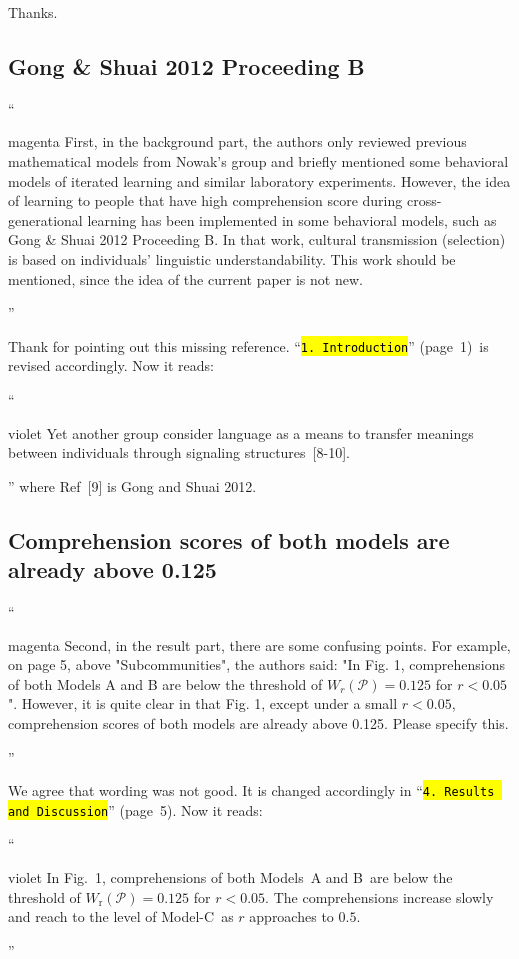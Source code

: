 \documentclass[10.5pt]{amsart}
\newcommand{\reffig}[1]{Fig.~\ref{#1}}
\newcommand{\hbColorReviewer}{magenta}
\newcommand{\hbColorManuscript}{violet}
\newenvironment{hbReviewer}
	{\list{}{\leftmargin=2cm\rightmargin=1cm}\item[]``\begin{footnotesize}
	\begin{color}{\hbColorReviewer}}	
	{\end{color}\end{footnotesize}''\endlist}
\newcommand{\hbMRefP}[2]{``\texttt{{\color{\hbColorManuscript}\hl{#1}}}''  (page~#2)}
\newenvironment{hbChanged}
	{\list{}{\leftmargin=1cm\rightmargin=1.5cm}\item[]``\begin{small}
	\begin{color}{\hbColorManuscript}}	
	{\end{color}\end{small}''\endlist}
\newcommand{\hbMIntroduction}{\hbMRefP{1. Introduction}{1}}
\newcommand{\hbMResultsAndDiscussion}{\hbMRefP{4. Results and Discussion}{5}}
\newcommand{\hbSet}[1]{\mathcal{#1}}
\newcommand{\hbInCLSrandom}[1]{W_{\text{r}}(#1)}
\newcommand{\hbMAB}{Models~A and B}
\newcommand{\hbMC}{Model-C}
\begin{document}
Thanks.





\subsection{Gong \& Shuai 2012 Proceeding B}
\begin{hbReviewer}
	First, in the background part, 
	the authors only reviewed previous mathematical models 
	from Nowak's group 
	and briefly mentioned some behavioral models of iterated learning 
	and similar laboratory experiments. 
	However, the idea of learning to people 
	that have high comprehension score during cross-generational learning 
	has been implemented in some behavioral models, 
	such as Gong \& Shuai 2012 Proceeding B. 
	In that work, cultural transmission (selection) is based on 
	individuals' linguistic understandability. 
	This work should be mentioned, 
	since the idea of the current paper is not new. 
\end{hbReviewer}

Thank for pointing out this missing reference.
\hbMIntroduction\ is revised accordingly.
Now it reads:
\begin{hbChanged}
	Yet another group consider language 
	as a means to transfer meanings between individuals
	through signaling structures~[8-10].
\end{hbChanged}
where Ref~[9] is Gong and Shuai 2012.




\subsection{Comprehension scores of both models are already above 0.125}
\begin{hbReviewer}
	Second, in the result part, there are some confusing points. 
	For example, on page 5, above "Subcommunities", the authors said: 
	"In Fig. 1, comprehensions of both Models A and B are
	 below the threshold of $W_{r}(\mathcal{P}) = 0.125$ for $r < 0.05$". 
	However, it is quite clear in that Fig. 1, 
	except under a small $r < 0.05$, 
	comprehension scores of both models are already above 0.125. 
	Please specify this.
\end{hbReviewer}

We agree that wording was not good.
It is changed accordingly in \hbMResultsAndDiscussion.
Now it reads:
\begin{hbChanged}
	In 
	Fig.~1, %
	comprehensions of both \hbMAB\ are below 
	the threshold of $\hbInCLSrandom{\hbSet{P}} = 0.125$ 
	for $r < 0.05$.
	The comprehensions increase slowly and reach to the level of \hbMC\ 
	as $r$ approaches to $0.5$.
\end{hbChanged}
\end{document}
